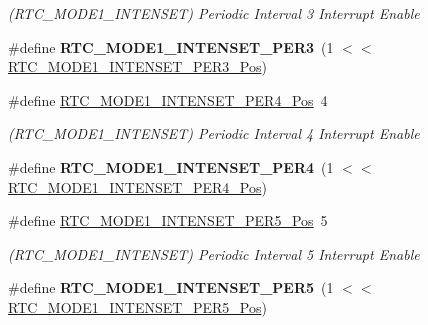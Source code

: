 \begin{DoxyCompactItemize}
\begin{DoxyCompactList}\small\item\em (R\+T\+C\+\_\+\+M\+O\+D\+E1\+\_\+\+I\+N\+T\+E\+N\+S\+E\+T) Periodic Interval 3 Interrupt Enable \end{DoxyCompactList}\item 
\hypertarget{group___s_a_m_l21___r_t_c_ga61628327324a0e62b39d275f76a24cdd}{}\#define {\bfseries R\+T\+C\+\_\+\+M\+O\+D\+E1\+\_\+\+I\+N\+T\+E\+N\+S\+E\+T\+\_\+\+P\+E\+R3}~(1 $<$$<$ \hyperlink{group___s_a_m_l21___r_t_c_gab1f7edcde7a3c1372465990a35982cd3}{R\+T\+C\+\_\+\+M\+O\+D\+E1\+\_\+\+I\+N\+T\+E\+N\+S\+E\+T\+\_\+\+P\+E\+R3\+\_\+\+Pos})\label{group___s_a_m_l21___r_t_c_ga61628327324a0e62b39d275f76a24cdd}

\item 
\hypertarget{group___s_a_m_l21___r_t_c_ga07057fce4875f1537a6c6f35d8fbb93e}{}\#define \hyperlink{group___s_a_m_l21___r_t_c_ga07057fce4875f1537a6c6f35d8fbb93e}{R\+T\+C\+\_\+\+M\+O\+D\+E1\+\_\+\+I\+N\+T\+E\+N\+S\+E\+T\+\_\+\+P\+E\+R4\+\_\+\+Pos}~4\label{group___s_a_m_l21___r_t_c_ga07057fce4875f1537a6c6f35d8fbb93e}

\begin{DoxyCompactList}\small\item\em (R\+T\+C\+\_\+\+M\+O\+D\+E1\+\_\+\+I\+N\+T\+E\+N\+S\+E\+T) Periodic Interval 4 Interrupt Enable \end{DoxyCompactList}\item 
\hypertarget{group___s_a_m_l21___r_t_c_gabe403bd020a7a7effe63b8d049949022}{}\#define {\bfseries R\+T\+C\+\_\+\+M\+O\+D\+E1\+\_\+\+I\+N\+T\+E\+N\+S\+E\+T\+\_\+\+P\+E\+R4}~(1 $<$$<$ \hyperlink{group___s_a_m_l21___r_t_c_ga07057fce4875f1537a6c6f35d8fbb93e}{R\+T\+C\+\_\+\+M\+O\+D\+E1\+\_\+\+I\+N\+T\+E\+N\+S\+E\+T\+\_\+\+P\+E\+R4\+\_\+\+Pos})\label{group___s_a_m_l21___r_t_c_gabe403bd020a7a7effe63b8d049949022}

\item 
\hypertarget{group___s_a_m_l21___r_t_c_ga3eb85eb29bc0f644953f975bd1b56967}{}\#define \hyperlink{group___s_a_m_l21___r_t_c_ga3eb85eb29bc0f644953f975bd1b56967}{R\+T\+C\+\_\+\+M\+O\+D\+E1\+\_\+\+I\+N\+T\+E\+N\+S\+E\+T\+\_\+\+P\+E\+R5\+\_\+\+Pos}~5\label{group___s_a_m_l21___r_t_c_ga3eb85eb29bc0f644953f975bd1b56967}

\begin{DoxyCompactList}\small\item\em (R\+T\+C\+\_\+\+M\+O\+D\+E1\+\_\+\+I\+N\+T\+E\+N\+S\+E\+T) Periodic Interval 5 Interrupt Enable \end{DoxyCompactList}\item 
\hypertarget{group___s_a_m_l21___r_t_c_ga4f17ec4ea5270f91bc10fc992a9ec6b2}{}\#define {\bfseries R\+T\+C\+\_\+\+M\+O\+D\+E1\+\_\+\+I\+N\+T\+E\+N\+S\+E\+T\+\_\+\+P\+E\+R5}~(1 $<$$<$ \hyperlink{group___s_a_m_l21___r_t_c_ga3eb85eb29bc0f644953f975bd1b56967}{R\+T\+C\+\_\+\+M\+O\+D\+E1\+\_\+\+I\+N\+T\+E\+N\+S\+E\+T\+\_\+\+P\+E\+R5\+\_\+\+Pos})\label{group___s_a_m_l21___r_t_c_ga4f17ec4ea5270f91bc10fc992a9ec6b2}


\end{DoxyCompactItemize}
